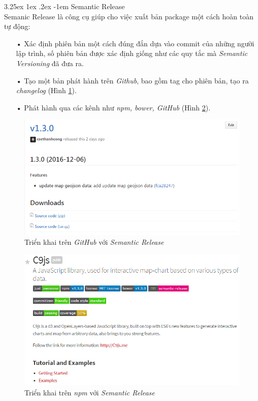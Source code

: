 \documentclass[12pt,a4paper]{article}
\makeatletter
\newcommand{\myparagraph}[1]{\paragraph{#1}\mbox{}\\} %
\renewcommand\paragraph{\@startsection{paragraph}{5}{\z@}%
  {3.25ex \@plus1ex \@minus.2ex}%
  {-1em}%
  {\normalfont\normalsize\bfseries}}
\makeatother
\begin{document}
\myparagraph{Semantic Release}
Semanic Release là công cụ giúp cho việc xuất bản package một cách hoàn toàn tự động:
\begin{itemize}
\item[•] Xác định phiên bản một cách đúng đắn dựa vào commit của những người lập trình, số phiên bản được xác định giống như các quy tắc mà \textit{Semantic Versioning} đã đưa ra.
\item[•] Tạo một bản phát hành trên \textit{Github}, bao gồm tag cho phiên bản, tạo ra \textit{changelog} (Hình \ref{fig:semantic_1}).
\item[•] Phát hành qua các kênh như \textit{npm, bower, GitHub} (Hình \ref{fig:semantic_2}).
\end{itemize}

\begin{figure}[!h]
	\begin{center}
    \includegraphics[scale=.8]{image/semantic_1}
    \caption{Triển khai trên \textit{GitHub} với \textit{Semantic Release}}
    \label{fig:semantic_1}
	\end{center}
\end{figure}

\begin{figure}[!h]
	\begin{center}
    \includegraphics[scale=.8]{image/semantic_2}
    \caption{Triển khai trên \textit{npm} với \textit{Semantic Release}}
    \label{fig:semantic_2}
	\end{center}
\end{figure}
\end{document}
